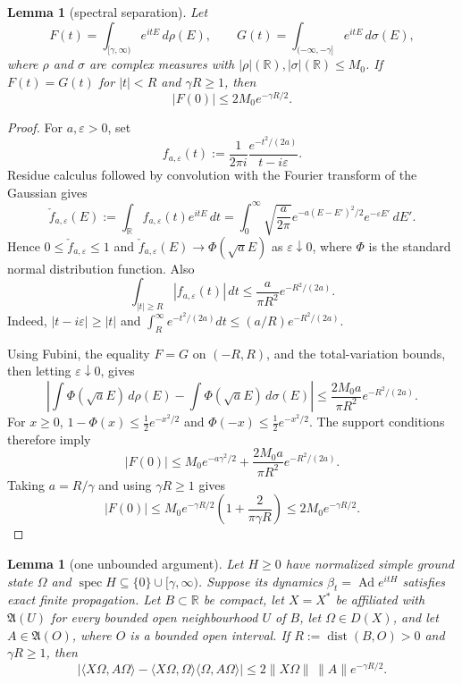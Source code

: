 \documentclass[11pt,a4paper]{article}
\newtheorem{lemma}[theorem]{Lemma}
\theoremstyle{remark}
\newcommand{\R}{\mathbb R}
\newcommand{\A}{\mathfrak A}
\newcommand{\Om}{\Omega}
\DeclareMathOperator{\dist}{dist}
\DeclareMathOperator{\spec}{spec}
\begin{document}
\begin{lemma}[spectral separation]\label{lem:spectral}
Let
\[
 F(t)=\int_{[\gamma,\infty)}e^{itE}\,d\rho(E),\qquad
 G(t)=\int_{(-\infty,-\gamma]}e^{itE}\,d\sigma(E),
\]
where $\rho$ and $\sigma$ are complex measures with
$|\rho|(\R),|\sigma|(\R)\le M_0$.  If $F(t)=G(t)$ for $|t|<R$ and $\gamma R\ge1$, then
\[
 |F(0)|\le2M_0e^{-\gamma R/2}.
\]
\end{lemma}

\begin{proof}
For $a,\varepsilon>0$, set
\[
 f_{a,\varepsilon}(t):=\frac1{2\pi i}\frac{e^{-t^2/(2a)}}{t-i\varepsilon}.
\]
Residue calculus followed by convolution with the Fourier transform of the Gaussian gives
\[
 \check f_{a,\varepsilon}(E):=\int_\R f_{a,\varepsilon}(t)e^{itE}\,dt
 =\int_0^\infty\sqrt{\frac a{2\pi}}
 e^{-a(E-E')^2/2}e^{-\varepsilon E'}\,dE'.
\]
Hence $0\le\check f_{a,\varepsilon}\le1$ and
$\check f_{a,\varepsilon}(E)\to\Phi(\sqrt aE)$ as $\varepsilon\downarrow0$, where $\Phi$ is the
standard normal distribution function.  Also
\[
 \int_{|t|\ge R}|f_{a,\varepsilon}(t)|\,dt
 \le\frac a{\pi R^2}e^{-R^2/(2a)}.
\]
Indeed, $|t-i\varepsilon|\ge|t|$ and
$\int_R^\infty e^{-t^2/(2a)}dt\le(a/R)e^{-R^2/(2a)}$.

Using Fubini, the equality $F=G$ on $(-R,R)$, and the total-variation bounds, then letting
$\varepsilon\downarrow0$, gives
\[
 \left|\int\Phi(\sqrt aE)\,d\rho(E)
       -\int\Phi(\sqrt aE)\,d\sigma(E)\right|
 \le \frac{2M_0a}{\pi R^2}e^{-R^2/(2a)}.
\]
For $x\ge0$, $1-\Phi(x)\le\tfrac12e^{-x^2/2}$ and
$\Phi(-x)\le\tfrac12e^{-x^2/2}$.  The support conditions therefore imply
\[
 |F(0)|\le
 M_0e^{-a\gamma^2/2}
 +\frac{2M_0a}{\pi R^2}e^{-R^2/(2a)}.
\]
Taking $a=R/\gamma$ and using $\gamma R\ge1$ gives
\[
 |F(0)|\le M_0e^{-\gamma R/2}
 \left(1+\frac{2}{\pi\gamma R}\right)
 \le2M_0e^{-\gamma R/2}.
\]
\end{proof}

\begin{lemma}[one unbounded argument]\label{lem:unboundedcluster}
Let $H\ge0$ have normalized simple ground state $\Om$ and
$\spec H\subseteq\{0\}\cup[\gamma,\infty)$.  Suppose its dynamics
$\beta_t=\operatorname{Ad}e^{itH}$ satisfies exact finite propagation.
Let $B\subset\R$ be compact, let $X=X^*$ be affiliated with $\A(U)$ for every bounded open
neighbourhood $U$ of $B$, let $\Om\in D(X)$, and let $A\in\A(O)$, where $O$ is a bounded open
interval.  If $R:=\dist(B,O)>0$ and $\gamma R\ge1$, then
\begin{equation}\label{eq:unboundedcluster}
 \left|\langle X\Om,A\Om\rangle
 -\langle X\Om,\Om\rangle\langle\Om,A\Om\rangle\right|
 \le2\|X\Om\|\,\|A\|e^{-\gamma R/2}.
\end{equation}
\end{lemma}
\end{document}
